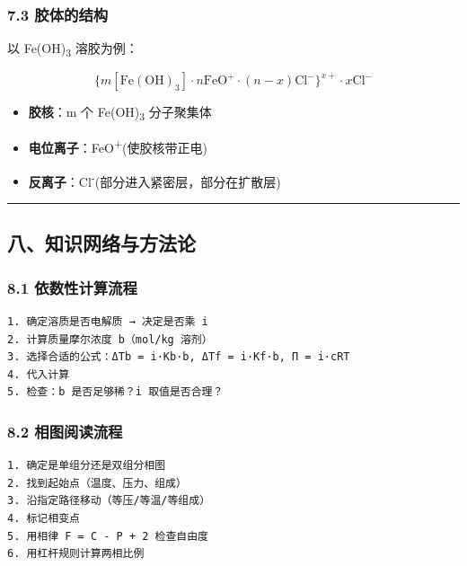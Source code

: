 \subsubsection{7.3 胶体的结构}\label{ux80f6ux4f53ux7684ux7ed3ux6784}

以 Fe(OH)\textsubscript{3} 溶胶为例：

\[
\{m[\mathrm{Fe(OH)_3}] \cdot n\mathrm{FeO^+} \cdot (n-x)\mathrm{Cl^-}\}^{x+} \cdot x\mathrm{Cl^-}
\]

\begin{itemize}
\tightlist
\item
  \textbf{胶核}：m 个 Fe(OH)\textsubscript{3} 分子聚集体
\item
  \textbf{电位离子}：FeO\textsuperscript{+}(使胶核带正电)
\item
  \textbf{反离子}：Cl\textsuperscript{-}(部分进入紧密层，部分在扩散层)
\end{itemize}

\begin{center}\rule{0.5\linewidth}{0.5pt}\end{center}

\subsection{八、知识网络与方法论}\label{ux516bux77e5ux8bc6ux7f51ux7edcux4e0eux65b9ux6cd5ux8bba}

\subsubsection{8.1 依数性计算流程}\label{ux4f9dux6570ux6027ux8ba1ux7b97ux6d41ux7a0b}

\begin{verbatim}
1. 确定溶质是否电解质 → 决定是否乘 i
2. 计算质量摩尔浓度 b（mol/kg 溶剂）
3. 选择合适的公式：ΔTb = i·Kb·b, ΔTf = i·Kf·b, Π = i·cRT
4. 代入计算
5. 检查：b 是否足够稀？i 取值是否合理？
\end{verbatim}

\subsubsection{8.2 相图阅读流程}\label{ux76f8ux56feux9605ux8bfbux6d41ux7a0b}

\begin{verbatim}
1. 确定是单组分还是双组分相图
2. 找到起始点（温度、压力、组成）
3. 沿指定路径移动（等压/等温/等组成）
4. 标记相变点
5. 用相律 F = C - P + 2 检查自由度
6. 用杠杆规则计算两相比例
\end{verbatim}

